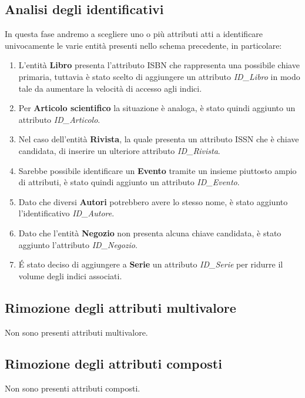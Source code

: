         \subsection{Analisi degli identificativi}
        In questa fase andremo a scegliere uno o più attributi atti a identificare univocamente
        le varie entità presenti nello schema precedente, in particolare:
            \begin{enumerate}
            \item L'entità \textbf{Libro} presenta l'attributo ISBN che rappresenta una possibile chiave primaria,
                  tuttavia è stato scelto di aggiungere un attributo \textit{ID\_Libro} in modo tale da aumentare
                  la velocità di accesso agli indici.
            \item Per \textbf{Articolo scientifico} la situazione è analoga, è stato quindi aggiunto un attributo
                  \textit{ID\_Articolo}.
            \item Nel caso dell'entità \textbf{Rivista}, la quale presenta un attributo ISSN che è chiave candidata,
                  di inserire un ulteriore attributo \textit{ID\_Rivista}.
            \item Sarebbe possibile identificare un \textbf{Evento} tramite un insieme piuttosto ampio di attributi, è
                  stato quindi aggiunto un attributo \textit{ID\_Evento}.
            \item Dato che diversi \textbf{Autori} potrebbero avere lo stesso nome, è stato aggiunto l'identificativo
                  \textit{ID\_Autore}.
            \item Dato che l'entità \textbf{Negozio} non presenta alcuna chiave candidata, è stato aggiunto l'attributo
                  \textit{ID\_Negozio}.
            \item \'E stato deciso di aggiungere a \textbf{Serie} un attributo \textit{ID\_Serie} per ridurre il volume degli
                  indici associati.
            \end{enumerate}
        \subsection{Rimozione degli attributi multivalore}
            Non sono presenti attributi multivalore.
        \subsection{Rimozione degli attributi composti}
            Non sono presenti attributi composti.
